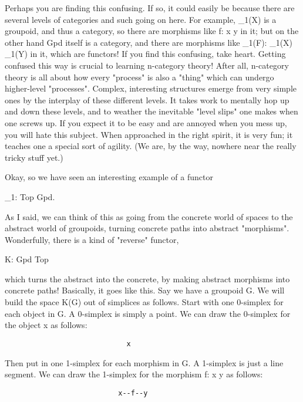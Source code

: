 Perhaps you are finding this confusing.  If so, it could easily be
because there are several levels of categories and such going on here.
For example, \Pi _{1}(X) is a groupoid, and thus a category, so
there are morphisms like f: x \to  y in it; but on the other hand Gpd
itself is a category, and there are morphisms like \Pi _{1}(F):
\Pi _{1}(X) \to  \Pi _{1}(Y) in it, which are functors!  If
you find this confusing, take heart.  Getting confused this way is
crucial to learning n-category theory!  After all, n-category theory is
all about how every "process" is also a "thing"
which can undergo higher-level "processes".  Complex,
interesting structures emerge from very simple ones by the interplay of
these different levels.  It takes work to mentally hop up and down these
levels, and to weather the inevitable "level slips" one makes
when one screws up.  If you expect it to be easy and are annoyed when
you mess up, you will hate this subject.  When approached in the right
spirit, it is very fun; it teaches one a special sort of agility.  (We
are, by the way, nowhere near the really tricky stuff yet.)

Okay, so we have seen an interesting example of a functor 
    
                     \Pi _{1}: Top \to  Gpd.   

As I said, we can think of this as going from the concrete world
of spaces to the abstract world of groupoids, turning concrete paths
into abstract "morphisms".  Wonderfully, there is a kind of "reverse"
functor,

                      K: Gpd \to  Top

which turns the abstract into the concrete, by making abstract morphisms
into concrete paths!  Basically, it goes like this.  Say we have a
groupoid G.  We will build the space K(G) out of simplices as follows.
Start with one 0-simplex for each object in G.  A 0-simplex is simply a
point.  We can draw the 0-simplex for the object x as follows:

\begin{verbatim}
                             x

\end{verbatim}
    
Then put in one 1-simplex for each morphism in G.  A 1-simplex is just a
line segment.  We can draw the 1-simplex for the morphism f: x \to  y as
follows: 

\begin{verbatim}
                           x--f--y

\end{verbatim}
    
